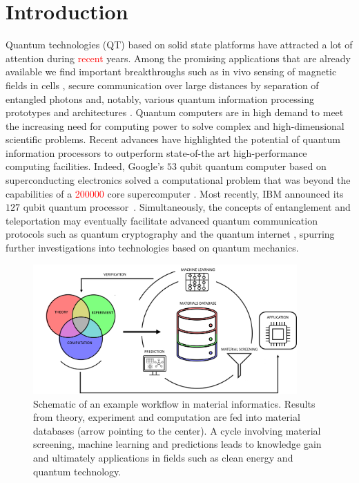 \documentclass[superscriptaddress,unsortedaddress,
 amsmath,amssymb,
 aps,
]{revtex4-2}
\newcommand{\mrk}[1]{\textcolor{red}{#1}}
\begin{document}
\section*{Introduction}
Quantum technologies (QT) based on solid state platforms have attracted a lot of attention during \mrk{recent}  years. 
Among the promising applications that are already available we find important breakthroughs such as in vivo sensing of magnetic fields in cells \cite{Lesage_2013}, secure communication over large distances by separation of entangled photons \cite{Ursin2007} and, notably, various quantum information processing prototypes and architectures \cite{Arute_2019}.  
Quantum computers are in high demand to meet the increasing need for computing power to solve complex and high-dimensional scientific problems. Recent advances have highlighted the potential of quantum information processors to outperform state-of-the art high-performance computing facilities.
Indeed, Google's $53$ qubit quantum computer based on superconducting electronics solved a computational problem that was beyond the capabilities of a \mrk{\num{200000}} core supercomputer \cite{Arute_2019}.
Most recently, IBM announced its $127$ qubit quantum processor~\cite{IBM2021}. Simultaneously, the concepts of entanglement and teleportation may eventually facilitate advanced quantum communication protocols such as quantum cryptography and the quantum internet \cite{quantum-internet-kimble}, spurring further investigations into technologies based on quantum mechanics.

\begin{figure}[t]
    \centering
    \includegraphics[width=0.9\textwidth]{figure1.png}
    \caption{Schematic of an example workflow in material informatics. Results from theory, experiment and computation are fed into material databases (arrow pointing to the center). A cycle involving material screening, machine learning and predictions leads to knowledge gain and ultimately applications in fields such as clean energy and quantum technology. 
    }
    \label{fig:ht-workflow}
\end{figure}
\end{document}
